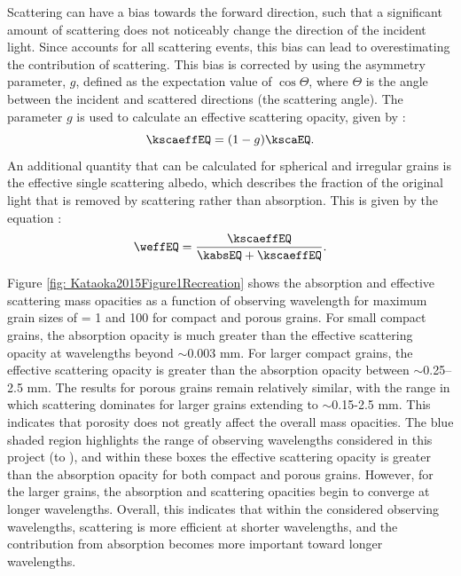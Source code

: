Scattering can have a bias towards the forward direction, such that a significant amount of scattering does not noticeably change the direction of the incident light. Since \ksca accounts for all scattering events, this bias can lead to \ksca overestimating the contribution of scattering. This bias is corrected by using the asymmetry parameter, $g$, defined as the expectation value of $\cos\Theta$, where $\Theta$ is the angle between the incident and scattered directions (the scattering angle). The parameter $g$ is used to calculate an effective scattering opacity, given by \citep{dsharp_code, Tazaki, Zhang2023}:
\begin{equation}
    \kscaeffEQ = (1-g)\kscaEQ.
\end{equation}
\nopindent An additional quantity that can be calculated for spherical and irregular grains is the effective single scattering albedo, which describes the fraction of the original light that is removed by scattering rather than absorption. This is given by the equation \citep{Zhang2023}: 
\begin{equation}
    \weffEQ = \frac{\kscaeffEQ}{\kabsEQ + \kscaeffEQ}.
    \label{eq: omega}
\end{equation}
 



Figure \ref{fig: Kataoka2015Figure1Recreation} shows the absorption and effective scattering mass opacities as a function of observing wavelength for maximum grain sizes of \amax = 1 \micron and 100 \micronNS for compact and porous grains. For small compact grains, the absorption opacity is much greater than the effective scattering opacity at wavelengths beyond $\sim$0.003 mm. For larger compact grains, the effective scattering opacity is greater than the absorption opacity between $\sim$0.25--2.5 mm. The results for porous grains remain relatively similar, with the range in which scattering dominates for larger grains extending to $\sim$0.15-2.5 mm. This indicates that porosity does not greatly affect the overall mass opacities. The blue shaded region highlights the range of observing wavelengths considered in this project (\bseven to \bfourNS), and within these boxes the effective scattering opacity is greater than the absorption opacity for both compact and porous grains. However, for the larger grains, the absorption and scattering opacities begin to converge at longer wavelengths. Overall, this indicates that within the considered observing wavelengths, scattering is more efficient at shorter wavelengths, and the contribution from absorption becomes more important toward longer wavelengths.



